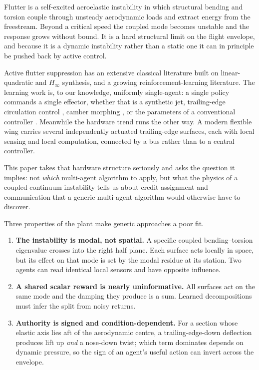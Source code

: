 \documentclass[11pt,a4paper]{article}
\begin{document}
Flutter is a self-excited aeroelastic instability in which structural bending and
torsion couple through unsteady aerodynamic loads and extract energy from the
freestream. Beyond a critical speed the coupled mode becomes unstable and the
response grows without bound. It is a hard structural limit on the flight
envelope, and because it is a dynamic instability rather than a static one it
can in principle be pushed back by active control.

Active flutter suppression has an extensive classical literature built on
linear-quadratic and $H_\infty$ synthesis, and a growing reinforcement-learning
literature. The learning work is, to our knowledge, uniformly single-agent: a
single policy commands a single effector, whether that is a synthetic jet,
trailing-edge circulation control \cite{circulation2023}, camber morphing
\cite{stallflutter2025}, or the parameters of a conventional controller
\cite{flyingwing2022}. Meanwhile the hardware trend runs the other way. A modern
flexible wing carries several independently actuated trailing-edge surfaces, each
with local sensing and local computation, connected by a bus rather than to a
central controller.

This paper takes that hardware structure seriously and asks the question it
implies: not \emph{which} multi-agent algorithm to apply, but what the physics of a
coupled continuum instability tells us about credit assignment and communication
that a generic multi-agent algorithm would otherwise have to discover.

Three properties of the plant make generic approaches a poor fit.

\begin{enumerate}
\item \textbf{The instability is modal, not spatial.} A specific coupled
bending--torsion eigenvalue crosses into the right half plane. Each surface acts
locally in space, but its effect on that mode is set by the modal residue at its
station. Two agents can read identical local sensors and have opposite influence.
\item \textbf{A shared scalar reward is nearly uninformative.} All surfaces act on
the same mode and the damping they produce is a sum. Learned decompositions
\cite{sunehag2018vdn,rashid2018qmix,foerster2018coma} must infer the split from
noisy returns.
\item \textbf{Authority is signed and condition-dependent.} For a section whose
elastic axis lies aft of the aerodynamic centre, a trailing-edge-down deflection
produces lift up \emph{and} a nose-down twist; which term dominates depends on
dynamic pressure, so the sign of an agent's useful action can invert across the
envelope.
\end{enumerate}
\end{document}
